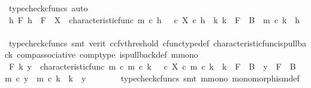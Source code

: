 \begin{isabellebody}
\ {\isacharparenleft}{\kern0pt}typecheck{\isacharunderscore}{\kern0pt}cfuncs{\isacharcomma}{\kern0pt}\ auto{\isacharparenright}{\kern0pt}\isanewline
{}\isamarkupfalse%
\isanewline
\ \ \isamarkupfalse%
\ {\isachardoublequoteopen}{\isasymAnd}h\ F{\isachardot}{\kern0pt}\ h\ {\isacharcolon}{\kern0pt}\ F\ {\isasymrightarrow}\ X\ {\isasymLongrightarrow}\ characteristic{\isacharunderscore}{\kern0pt}func\ m\ {\isasymcirc}\isactrlsub c\ h\ {\isacharequal}{\kern0pt}\ {\isacharparenleft}{\kern0pt}{\isasymt}\ {\isasymcirc}\isactrlsub c\ {\isasymbeta}\isactrlbsub X\isactrlesub {\isacharparenright}{\kern0pt}\ {\isasymcirc}\isactrlsub c\ h\ {\isasymLongrightarrow}\ {\isasymexists}k{\isachardot}{\kern0pt}\ k\ {\isacharcolon}{\kern0pt}\ F\ {\isasymrightarrow}\ B\ {\isasymand}\ m\ {\isasymcirc}\isactrlsub c\ k\ {\isacharequal}{\kern0pt}\ h{\isachardoublequoteclose}\isanewline
\ \ \ \ \isamarkupfalse%
\ {\isacharparenleft}{\kern0pt}typecheck{\isacharunderscore}{\kern0pt}cfuncs{\isacharcomma}{\kern0pt}\ smt\ {\isacharparenleft}{\kern0pt}verit{\isacharcomma}{\kern0pt}\ ccfv{\isacharunderscore}{\kern0pt}threshold{\isacharparenright}{\kern0pt}\ cfunc{\isacharunderscore}{\kern0pt}type{\isacharunderscore}{\kern0pt}def\ characteristic{\isacharunderscore}{\kern0pt}func{\isacharunderscore}{\kern0pt}is{\isacharunderscore}{\kern0pt}pullback\ comp{\isacharunderscore}{\kern0pt}associative\ comp{\isacharunderscore}{\kern0pt}type\ is{\isacharunderscore}{\kern0pt}pullback{\isacharunderscore}{\kern0pt}def\ m{\isacharunderscore}{\kern0pt}mono{\isacharparenright}{\kern0pt}\isanewline
{}\isamarkupfalse%
\isanewline
\ \ \isamarkupfalse%
\ {\isachardoublequoteopen}{\isasymAnd}F\ k\ y{\isachardot}{\kern0pt}\ \ characteristic{\isacharunderscore}{\kern0pt}func\ m\ {\isasymcirc}\isactrlsub c\ m\ {\isasymcirc}\isactrlsub c\ k\ {\isacharequal}{\kern0pt}\ {\isacharparenleft}{\kern0pt}{\isasymt}\ {\isasymcirc}\isactrlsub c\ {\isasymbeta}\isactrlbsub X\isactrlesub {\isacharparenright}{\kern0pt}\ {\isasymcirc}\isactrlsub c\ m\ {\isasymcirc}\isactrlsub c\ k\ {\isasymLongrightarrow}\ k\ {\isacharcolon}{\kern0pt}\ F\ {\isasymrightarrow}\ B\ {\isasymLongrightarrow}\ y\ {\isacharcolon}{\kern0pt}\ F\ {\isasymrightarrow}\ B\ {\isasymLongrightarrow}\ m\ {\isasymcirc}\isactrlsub c\ y\ {\isacharequal}{\kern0pt}\ m\ {\isasymcirc}\isactrlsub c\ k\ {\isasymLongrightarrow}\ k\ {\isacharequal}{\kern0pt}\ y{\isachardoublequoteclose}\isanewline
\ \ \ \ \ \ \isamarkupfalse%
\ {\isacharparenleft}{\kern0pt}typecheck{\isacharunderscore}{\kern0pt}cfuncs{\isacharcomma}{\kern0pt}\ smt\ m{\isacharunderscore}{\kern0pt}mono\ monomorphism{\isacharunderscore}{\kern0pt}def{}{\isacharparenright}{\kern0pt}\isanewline

\end{isabellebody}

